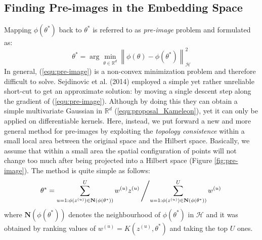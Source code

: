 \documentclass{article} %
\begin{document}
\subsection{Finding Pre-images in the Embedding Space}
Mapping $\phi(\theta^*)$ back to $\theta^*$ is referred to as \emph{pre-image} problem and formulated as:
\begin{equation}
	\theta^*=\arg\min_{\theta\in \mathbb{R}^{d}}\left\|\phi(\theta)-\phi(\theta^*)\right\|^2_{\mathcal{H}}
	\label{equ:pre-image}
\end{equation}
In general, (\ref{equ:pre-image}) is a non-convex minimization problem and therefore difficult to solve. Sejdinovic et al. (2014) \cite{MCMC_Kameleon} employed a simple yet rather 
unreliable short-cut to get an approximate solution: by moving a single descent step along the gradient of (\ref{equ:pre-image}). 
Although by doing this they can obtain a simple multivariate Gaussian in $\mathbb{R}^d$ (\ref{equ:proposal_Kameleon}), yet it can only be applied on differentiable kernels. 
Here, instead, we put forward a new and more general method for pre-images by exploiting the \emph{topology consistence} within a small local area between the original space and the 
Hilbert space. Basically, we assume that  within a small area the spatial configuration of points will not change too much after being projected into a Hilbert 
space (Figure \ref{fig:pre-image}). The method is quite simple as follows: 
\begin{equation}
	\theta^*=\sum_{u=1:\phi(z^{(u)})\in\mathbf{N}(\phi(\theta^*))}^{U} w^{(u)} z^{(u)} \left/ \sum_{u=1:\phi(z^{(u)})\in\mathbf{N}(\phi(\theta^*))}^{U} w^{(u)}\right.
\end{equation}
where $\mathbf{N}(\phi(\theta^*))$ denotes the neighbourhood of $\phi(\theta^*)$ in $\mathcal{H}$ and it was obtained by ranking values of 
$w^{(u)}=K(z^{(u)}, \theta^*)$  and taking the top $U$ ones.   
\end{document}
